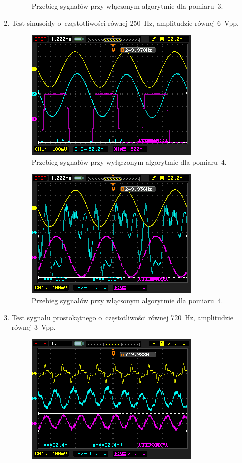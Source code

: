 \begin{enumerate}
\begin{figure}[h!]
		\caption{Przebieg sygnałów przy włączonym algorytmie dla pomiaru~3.}
		\label{fig:test_3_on}
	\end{figure}
	\item Test sinusoidy o~częstotliwości równej \SI{250}{\Hz}, amplitudzie równej 6~Vpp.\\
	\begin{figure}[h!]
		\centering
		\includegraphics[scale=0.7]{../Assets/Results/4_250_6_off.png}
		\caption{Przebieg sygnałów przy wyłączonym algorytmie dla pomiaru~4.}
		\label{fig:test_4_off}
	\end{figure}
	\begin{figure}[h!]
		\centering
		\includegraphics[scale=0.7]{../Assets/Results/4_250_6_on_notworking.png}
		\caption{Przebieg sygnałów przy włączonym algorytmie dla pomiaru~4.}
		\label{fig:test_4_on}
	\end{figure}	
	\item Test sygnału prostokątnego o~częstotliwości równej \SI{720}{\Hz}, amplitudzie równej 3~Vpp.\\
	\begin{figure}[h!]
		\centering
		\includegraphics[scale=0.7]{../Assets/Results/5_720_3_sq_off.png}

\end{figure}
\end{enumerate}

